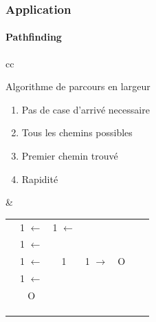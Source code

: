 	\begin{frame}
	\frametitle{Application}
	\framesubtitle{Pathfinding}
	
		\begin{tabular}{cc}
			\begin{minipage}{5cm}
				Algorithme de parcours en largeur
				\begin{enumerate}
					\item Pas de case d'arrivé necessaire
					\item Tous les chemins possibles
					\item Premier chemin trouvé
					\item Rapidité
				\end{enumerate}
			\end{minipage} &
			\begin{minipage}{5cm}
							\begin{center}
				\begin{tabular}{|c|c|c|c|c|c|c|} \hline
				\rowcolor{gray}  &  &                    &  &                  &  &                   \\\hline
				\cellcolor{gray} & \cellcolor{orange}1 $\leftarrow$ & \cellcolor{green}1 $\leftarrow$                   &&                && \cellcolor{gray} \\\hline
				\cellcolor{gray} & \cellcolor{orange}1 $\leftarrow$ & \cellcolor{gray}   & \cellcolor{gray} & \cellcolor{gray} &&	\cellcolor{gray} \\\hline
				\cellcolor{gray} & \cellcolor{orange}1 $\leftarrow$ & \cellcolor{orange}1 & \cellcolor{orange}1 $\rightarrow$ & \cellcolor{red}O                 && \cellcolor{gray} \\\hline
				\cellcolor{gray} & \cellcolor{orange}1 $\leftarrow$ & \cellcolor{gray}   & \cellcolor{gray} & \cellcolor{gray} && \cellcolor{gray} \\\hline
				\cellcolor{gray} & \cellcolor{red}O &                  &  &                && \cellcolor{gray} \\\hline
				\cellcolor{gray} && \cellcolor{gray}   && \cellcolor{gray} &&	\cellcolor{gray} \\\hline
				\cellcolor{gray} &&                  &&                && \cellcolor{gray} \\\hline
				\rowcolor{gray}  &  &                    &  &                  &  & \\\hline
				\end{tabular}
			\end{center}
			\end{minipage}\\
		\end{tabular}	
	
	\end{frame}
	
